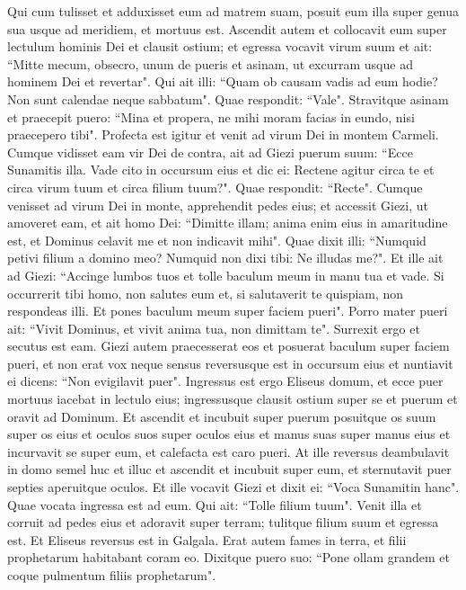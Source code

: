 \begin{biblechapter}
\verse Qui cum tulisset et adduxisset eum ad matrem suam, posuit eum illa super genua sua usque ad meridiem, et mortuus est. 
\verse Ascendit autem et collocavit eum super lectulum hominis Dei et clausit ostium; et egressa 
\verse vocavit virum suum et ait: “Mitte mecum, obsecro, unum de pueris et asinam, ut excurram usque ad hominem Dei et revertar". 
\verse Qui ait illi: “Quam ob causam vadis ad eum hodie? Non sunt calendae neque sabbatum". Quae respondit: “Vale". 
\verse Stravitque asinam et praecepit puero: “Mina et propera, ne mihi moram facias in eundo, nisi praecepero tibi". 
\verse Profecta est igitur et venit ad virum Dei in montem Carmeli. Cumque vidisset eam vir Dei de contra, ait ad Giezi puerum suum: “Ecce Sunamitis illa. 
\verse Vade cito in occursum eius et dic ei: Rectene agitur circa te et circa virum tuum et circa filium tuum?". Quae respondit: “Recte". 
\verse Cumque venisset ad virum Dei in monte, apprehendit pedes eius; et accessit Giezi, ut amoveret eam, et ait homo Dei: “Dimitte illam; anima enim eius in amaritudine est, et Dominus celavit me et non indicavit mihi". 
\verse Quae dixit illi: “Numquid petivi filium a domino meo? Numquid non dixi tibi: Ne illudas me?". 
\verse Et ille ait ad Giezi: “Accinge lumbos tuos et tolle baculum meum in manu tua et vade. Si occurrerit tibi homo, non salutes eum et, si salutaverit te quispiam, non respondeas illi. Et pones baculum meum super faciem pueri". 
\verse Porro mater pueri ait: “Vivit Dominus, et vivit anima tua, non dimittam te". Surrexit ergo et secutus est eam. 
\verse Giezi autem praecesserat eos et posuerat baculum super faciem pueri, et non erat vox neque sensus reversusque est in occursum eius et nuntiavit ei dicens: “Non evigilavit puer". 
\verse Ingressus est ergo Eliseus domum, et ecce puer mortuus iacebat in lectulo eius; 
\verse ingressusque clausit ostium super se et puerum et oravit ad Dominum. 
\verse Et ascendit et incubuit super puerum posuitque os suum super os eius et oculos suos super oculos eius et manus suas super manus eius et incurvavit se super eum, et calefacta est caro pueri. 
\verse At ille reversus deambulavit in domo semel huc et illuc et ascendit et incubuit super eum, et sternutavit puer septies aperuitque oculos. 
\verse Et ille vocavit Giezi et dixit ei: “Voca Sunamitin hanc". Quae vocata ingressa est ad eum. Qui ait: “Tolle filium tuum". 
\verse Venit illa et corruit ad pedes eius et adoravit super terram; tulitque filium suum et egressa est. 
\verse Et Eliseus reversus est in Galgala. Erat autem fames in terra, et filii prophetarum habitabant coram eo. Dixitque puero suo: “Pone ollam grandem et coque pulmentum filiis prophetarum". 

\end{biblechapter}
